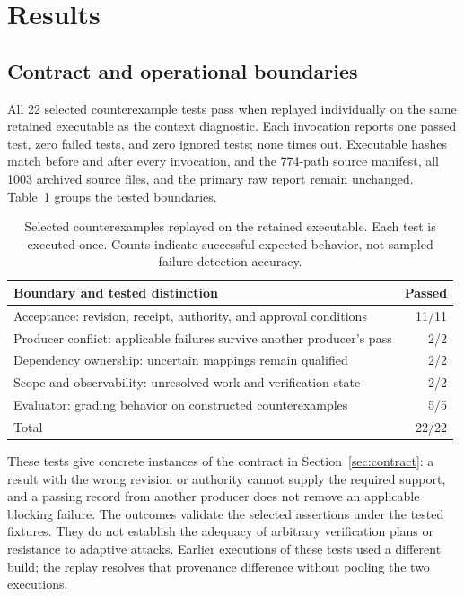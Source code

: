 \section{Results}
\label{sec:results}
\subsection{Contract and operational boundaries}
All 22 selected counterexample tests pass when replayed individually on the same retained executable as the context diagnostic. Each invocation reports one passed test, zero failed tests, and zero ignored tests; none times out. Executable hashes match before and after every invocation, and the 774-path source manifest, all 1003 archived source files, and the primary raw report remain unchanged. Table~\ref{tab:counterexamples} groups the tested boundaries.

\begin{table}[t]
\small
\caption{Selected counterexamples replayed on the retained executable. Each test is executed once. Counts indicate successful expected behavior, not sampled failure-detection accuracy.}
\label{tab:counterexamples}
\begin{tabularx}{\columnwidth}{@{}Xr@{}}
\toprule
Boundary and tested distinction & Passed\\
\midrule
Acceptance: revision, receipt, authority, and approval conditions & 11/11\\
Producer conflict: applicable failures survive another producer's pass & 2/2\\
Dependency ownership: uncertain mappings remain qualified & 2/2\\
Scope and observability: unresolved work and verification state & 2/2\\
Evaluator: grading behavior on constructed counterexamples & 5/5\\
\midrule
Total & 22/22\\
\bottomrule
\end{tabularx}
\end{table}

These tests give concrete instances of the contract in Section~\ref{sec:contract}: a result with the wrong revision or authority cannot supply the required support, and a passing record from another producer does not remove an applicable blocking failure. The outcomes validate the selected assertions under the tested fixtures. They do not establish the adequacy of arbitrary verification plans or resistance to adaptive attacks. Earlier executions of these tests used a different build; the replay resolves that provenance difference without pooling the two executions.

